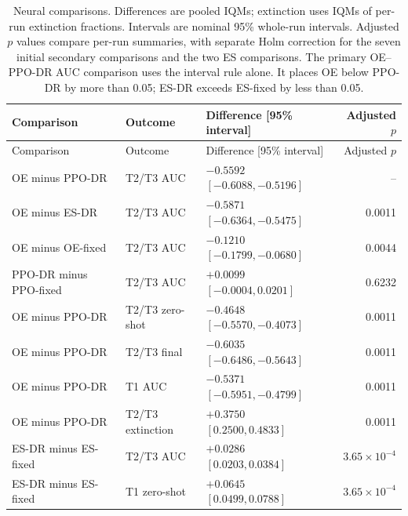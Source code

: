 {\small
\begin{longtable}{P{3.3cm}P{2.0cm}P{4.8cm}r}
\caption{Neural comparisons. Differences are pooled IQMs; extinction uses IQMs of per-run extinction fractions. Intervals are nominal 95\% whole-run intervals. Adjusted $p$ values compare per-run summaries, with separate Holm correction for the seven initial secondary comparisons and the two ES comparisons. The primary OE--PPO-DR AUC comparison uses the interval rule alone. It places OE below PPO-DR by more than 0.05; ES-DR exceeds ES-fixed by less than 0.05.}\label{tab:tests}\\
\toprule
Comparison & Outcome & Difference [95\% interval] & Adjusted $p$\\\midrule
\endfirsthead
\toprule
Comparison & Outcome & Difference [95\% interval] & Adjusted $p$\\\midrule
\endhead
\bottomrule\endfoot
OE minus PPO-DR & T2/T3 AUC & $-0.5592$ $[-0.6088,-0.5196]$ & --\\
OE minus ES-DR & T2/T3 AUC & $-0.5871$ $[-0.6364,-0.5475]$ & 0.0011\\
OE minus OE-fixed & T2/T3 AUC & $-0.1210$ $[-0.1799,-0.0680]$ & 0.0044\\
PPO-DR minus PPO-fixed & T2/T3 AUC & $+0.0099$ $[-0.0004,0.0201]$ & 0.6232\\
OE minus PPO-DR & T2/T3 zero-shot & $-0.4648$ $[-0.5570,-0.4073]$ & 0.0011\\
OE minus PPO-DR & T2/T3 final & $-0.6035$ $[-0.6486,-0.5643]$ & 0.0011\\
OE minus PPO-DR & T1 AUC & $-0.5371$ $[-0.5951,-0.4799]$ & 0.0011\\
OE minus PPO-DR & T2/T3 extinction & $+0.3750$ $[0.2500,0.4833]$ & 0.0011\\
ES-DR minus ES-fixed & T2/T3 AUC & $+0.0286$ $[0.0203,0.0384]$ & $3.65\times10^{-4}$\\
ES-DR minus ES-fixed & T1 zero-shot & $+0.0645$ $[0.0499,0.0788]$ & $3.65\times10^{-4}$\\
\end{longtable}
}
